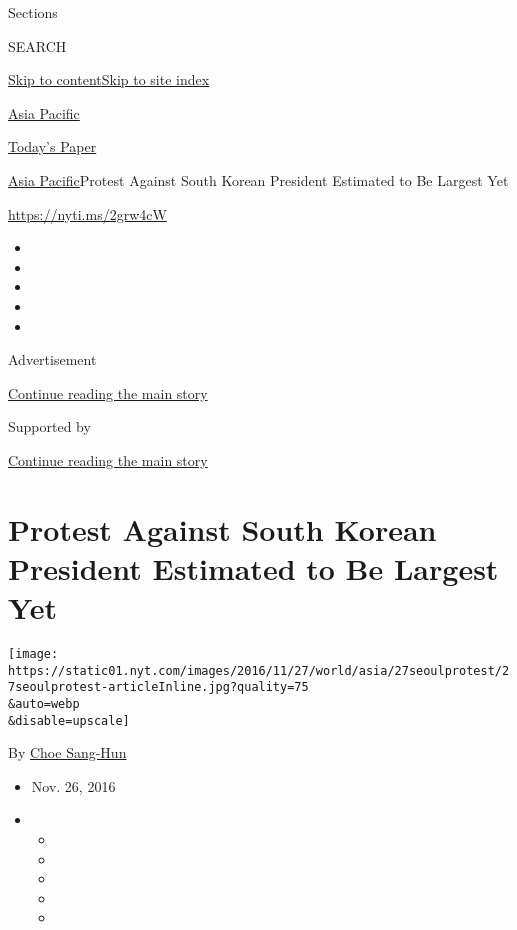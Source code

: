 Sections

SEARCH

\protect\hyperlink{site-content}{Skip to
content}\protect\hyperlink{site-index}{Skip to site index}

\href{https://www.nytimes.com/section/world/asia}{Asia Pacific}

\href{https://myaccount.nytimes.com/auth/login?response_type=cookie\&client_id=vi}{}

\href{https://www.nytimes.com/section/todayspaper}{Today's Paper}

\href{/section/world/asia}{Asia Pacific}\textbar{}Protest Against South
Korean President Estimated to Be Largest Yet

\url{https://nyti.ms/2grw4cW}

\begin{itemize}
\item
\item
\item
\item
\item
\end{itemize}

Advertisement

\protect\hyperlink{after-top}{Continue reading the main story}

Supported by

\protect\hyperlink{after-sponsor}{Continue reading the main story}

\hypertarget{protest-against-south-korean-president-estimated-to-be-largest-yet}{%
\section{Protest Against South Korean President Estimated to Be Largest
Yet}\label{protest-against-south-korean-president-estimated-to-be-largest-yet}}

\texttt{[image: https://static01.nyt.com/images/2016/11/27/world/asia/27seoulprotest/27seoulprotest-articleInline.jpg?quality=75\\\&auto=webp\\\&disable=upscale]}

By \href{http://www.nytimes.com/by/choe-sang-hun}{Choe Sang-Hun}

\begin{itemize}
\item
  Nov. 26, 2016
\item
  \begin{itemize}
  \item
  \item
  \item
  \item
  \item
  \end{itemize}
\end{itemize}

